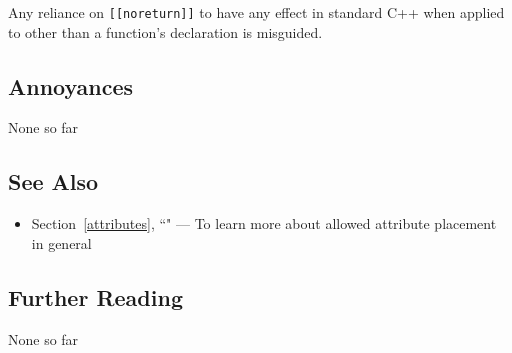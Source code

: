 \noindent Any reliance on \texttt{[[noreturn]]} to have any effect in standard C++
when applied to other than a function's declaration is misguided.

\subsection[Annoyances]{Annoyances}\label{annoyances}

None so far

\subsection[See Also]{See Also}\label{see-also}

\begin{itemize}
\item{Section~\ref{attributes}, ``" — To learn more about allowed attribute placement in general}
\end{itemize}

\subsection[Further Reading]{Further Reading}\label{further-reading}

None so far



